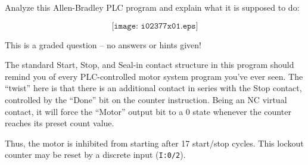 

Analyze this Allen-Bradley PLC program and explain what it is supposed to do:

$$\texttt{[image: i02377x01.eps]}$$

\vfil

\eject






This is a graded question -- no answers or hints given!







The standard Start, Stop, and Seal-in contact structure in this program should remind you of every PLC-controlled motor system program you've ever seen.  The ``twist'' here is that there is an additional contact in series with the Stop contact, controlled by the ``Done'' bit on the counter instruction.  Being an NC virtual contact, it will force the ``Motor'' output bit to a 0 state whenever the counter reaches its preset count value.  

\vskip 10pt

Thus, the motor is inhibited from starting after 17 start/stop cycles.  This lockout counter may be reset by a discrete input ({\tt I:0/2}).





